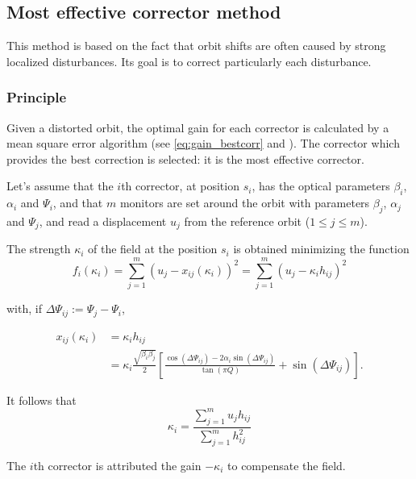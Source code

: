 \subsection{Most effective corrector method}
\label{sec:most_effective_corr}
This method is based on the fact that orbit shifts are often caused by strong localized disturbances. Its goal is to correct particularly each disturbance.

\subsubsection{Principle}
Given a distorted orbit, the optimal gain for each corrector is calculated by a mean square error algorithm (see \cref{eq:gain_bestcorr} and \cite{book:wille}). The corrector which provides the best correction is selected: it is the most effective corrector.

Let's assume that the $i$th corrector, at position $s_i$, has the optical parameters $\beta_i$, $\alpha_i$ and $\Psi_i$, and that $m$ monitors are set around the orbit with parameters $\beta_j$, $\alpha_j$ and $\Psi_j$, and read a displacement $u_j$ from the reference orbit ($1 \leq j \leq m$).

The strength $\kappa_i$ of the field at the position $s_i$ is obtained minimizing the function
\begin{equation}
	\label{eq:gain_bestcorr}
    f_i(\kappa_i) = \sum\limits_{j=1}^{m} (u_j-x_{ij}(\kappa_i))^2
                  = \sum\limits_{j=1}^{m} (u_j- \kappa_i h_{ij})^2
\end{equation}

with, if $\Delta \Psi_{ij} := \Psi_j-\Psi_i$,

\begin{align}
    \label{eq:hij}
    x_{ij}(\kappa_i) &= \kappa_i h_{ij} \nonumber\\
                     &= \kappa_i \frac{\sqrt{\beta_i \beta_j}}{2}
                         \left[
                             \frac{\cos(\Delta \Psi_{ij}) - 2\alpha_i \sin(\Delta\Psi_{ij})}
                                  {\tan (\pi Q)} + \sin (\Delta\Psi_{ij})
                         \right].
\end{align}

It follows that
\begin{equation}
    \kappa_i = \frac{\sum\limits_{j=1}^m u_j h_{ij}}{\sum\limits_{j=1}^m h_{ij}^2}
\end{equation}

The $i$th corrector is attributed the gain $-\kappa_i$ to compensate the field.

